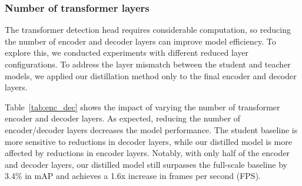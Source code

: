 \subsubsection{Number of transformer layers}

The transformer detection head requires considerable computation, so reducing the number of encoder and decoder layers can improve model efficiency. To explore this, we conducted experiments with different reduced layer configurations. To address the layer mismatch between the student and teacher models, we applied our distillation method only to the final encoder and decoder layers.

Table~\ref{tab:enc_dec} shows the impact of varying the number of transformer encoder and decoder layers. As expected, reducing the number of encoder/decoder layers decreases the model performance. The student baseline is more sensitive to reductions in decoder layers, while our distilled model is more affected by reductions in encoder layers.
Notably, with only half of the encoder and decoder layers, our distilled model still surpasses the full-scale baseline by 3.4\% in mAP and achieves a 1.6x increase in frames per second (FPS). 
